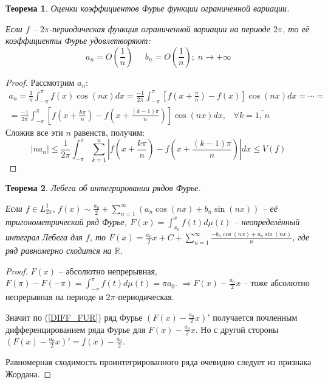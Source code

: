 \documentclass[a4paper,12pt]{article}
\renewcommand{\leq}{\ensuremath{\leqslant}}
\theoremstyle{plain}
\newtheorem{theorem}{Теорема}[section]
\theoremstyle{definition}
\theoremstyle{remark}
\begin{document}
\begin{theorem}
	Оценки коэффициентов Фурье функции ограниченной вариации.

	Если $f$ -- $2\pi$-периодическая функция ограниченной вариации на периоде $2\pi$, то её коэффициенты Фурье удовлетворяют:
	\[a_n = O\left(\frac{1}{n}\right)\;\;\;\;\; b_n = O\left(\frac{1}{n}\right);\; n \to +\infty\]
\end{theorem}

\begin{proof}
	Рассмотрим $a_n$:
	\begin{align*}
		a_n = \frac{1}{\pi}\int_{-\pi}^\pi f(x)\cos(nx)dx = \frac{-1}{2\pi}\int_{-\pi}^\pi \left[f(x + \frac{\pi}{n}) - f(x)\right]\cos(nx)dx = \cdots = \\
		= \frac{-1}{2\pi}\int_{-\pi}^\pi \left[f\left(x + \frac{k\pi}{n}\right) - f\left(x + \frac{(k - 1)\pi}{n}\right)\right]\cos(nx)dx,\;\;\; \forall k = \overline{1,\,n}
	\end{align*}
	Сложив все эти $n$ равенств, получим:
	\[
		|na_n| \leq \frac{1}{2\pi} \int_{-\pi}^\pi \sum_{k = 1}^n \left|f\left(x + \frac{k\pi}{n}\right) - f\left(x + \frac{(k - 1)\pi}{n}\right)\right|dx \leq V(f)
	\]
\end{proof}

\begin{theorem}
	Лебега об интегрировании рядов Фурье.

	Если $f \in L^1_{2\pi},\, f(x) \sim \frac{a_0}{2} + \sum_{n = 1}^\infty (a_n\cos(nx) + b_n\sin(nx))$ -- её тригонометрический ряд Фурье, $F(x) = \int_{x_0}^x f(t)d\mu(t)$ -- неопределённый интеграл Лебега для $f$, то $F(x) = \frac{a_0}{2}x + C + \sum_{n = 1}^\infty \frac{-b_n\cos(nx) + a_n\sin(nx)}{n}$, где ряд равномерно сходится на $\mathbb{R}$.
\end{theorem}

\begin{proof}
	$F(x)$ -- абсолютно непрерывная, $F(\pi) - F(-\pi) = \int_{-\pi}^\pi f(t)d\mu(t) = \pi a_0$. $\Rightarrow F(x) - \frac{a_0}{2}x$ -- тоже абсолютно непрерывная на периоде и $2\pi$-периодическая.

	Значит по (\ref{DIFF_FUR}) ряд Фурье $\left(F(x) - \frac{a_0}{2}x\right)'$ получается почленным дифференцированием ряда Фурье для $F(x) - \frac{a_0}{2}x$. Но с другой стороны $\left(F(x) - \frac{a_0}{2}x\right)' = f(x) - \frac{a_0}{2}$.

	Равномерная сходимость проинтегрированного ряда очевидно следует из признака Жордана.
\end{proof}
\end{document}

